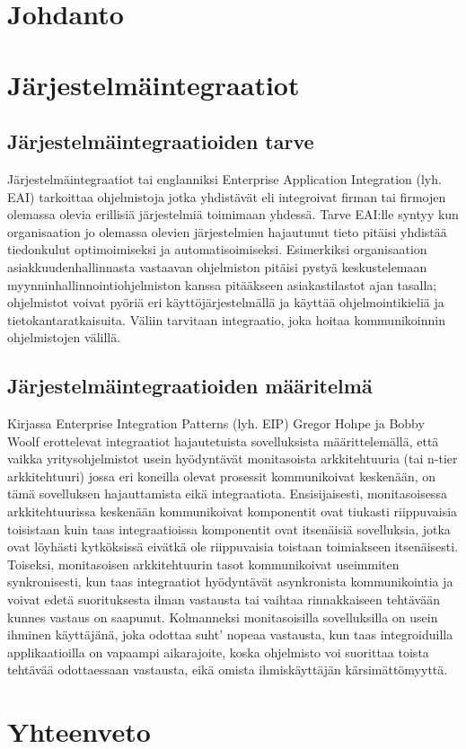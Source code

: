 \chapter{Johdanto}

\chapter{Järjestelmäintegraatiot}

\section{Järjestelmäintegraatioiden tarve}

Järjestelmäintegraatiot tai englanniksi Enterprise Application Integration (lyh. EAI) tarkoittaa
ohjelmistoja jotka yhdistävät eli integroivat firman tai firmojen olemassa olevia erillisiä
järjestelmiä toimimaan yhdessä. Tarve EAI:lle syntyy kun organisaation jo olemassa olevien
järjestelmien hajautunut tieto pitäisi yhdistää tiedonkulut optimoimiseksi ja
automatisoimiseksi. Esimerkiksi organisaation asiakkuudenhallinnasta vastaavan ohjelmiston
pitäisi pystyä keskustelemaan myynninhallinnointiohjelmiston kanssa pitääkseen
asiakastilastot ajan tasalla; ohjelmistot voivat pyöriä eri käyttöjärjestelmällä ja käyttää
ohjelmointikieliä ja tietokantaratkaisuita. Väliin tarvitaan integraatio, joka hoitaa
kommunikoinnin ohjelmistojen välillä.

\section{Järjestelmäintegraatioiden määritelmä}
Kirjassa Enterprise Integration Patterns (lyh. EIP) Gregor Hohpe ja Bobby Woolf \citep{10.5555/940308}
erottelevat integraatiot hajautetuista sovelluksista määrittelemällä, että vaikka
yritysohjelmistot usein hyödyntävät monitasoista arkkitehtuuria (tai n-tier arkkitehtuuri) jossa
eri koneilla olevat prosessit kommunikoivat keskenään, on tämä sovelluksen hajauttamista
eikä integraatiota. Ensisijaisesti, monitasoisessa arkkitehtuurissa keskenään kommunikoivat
komponentit ovat tiukasti riippuvaisia toisistaan kuin taas integraatioissa komponentit ovat
itsenäisiä sovelluksia, jotka ovat löyhästi kytköksissä eivätkä ole riippuvaisia toistaan
toimiakseen itsenäisesti. Toiseksi, monitasoisen arkkitehtuurin tasot kommunikoivat
useimmiten synkronisesti, kun taas integraatiot hyödyntävät asynkronista kommunikointia ja
voivat edetä suorituksesta ilman vastausta tai vaihtaa rinnakkaiseen tehtävään kunnes vastaus
on saapunut. Kolmanneksi monitasoisilla sovelluksilla on usein ihminen käyttäjänä, joka
odottaa suht’ nopeaa vastausta, kun taas integroiduilla applikaatioilla on vapaampi aikarajoite,
koska ohjelmisto voi suorittaa toista tehtävää odottaessaan vastausta, eikä omista
ihmiskäyttäjän kärsimättömyyttä.


\chapter{Yhteenveto}